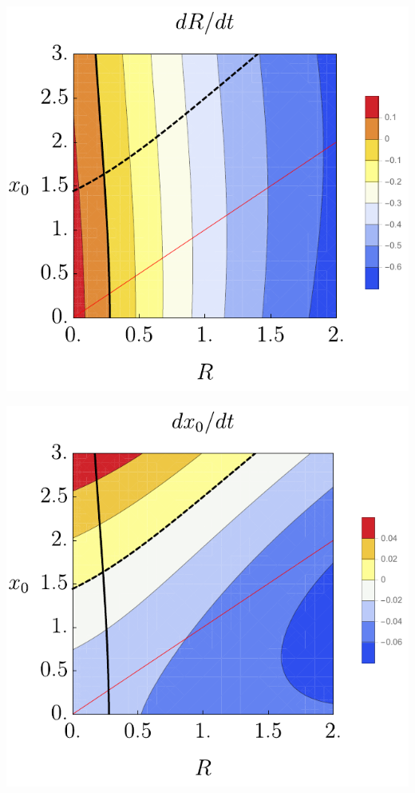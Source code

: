 \documentclass{Dissertate}
\let\origfigure\figure
\let\endorigfigure\endfigure
\renewenvironment{figure}[1][2] {
    \expandafter\origfigure\expandafter[H]
} {
    \endorigfigure
}
\begin{document}
\begin{figure}
\hypertarget{fig:drdtdecay}{%
\centering
\includegraphics{source/figures/pdf/dRdt.pdf}
\caption{\(dR/dt\) as a function of \(x_0\) and \(R\). The solid black
line denotes the \(dR/dt=0\) and the dashed line \(dx_0/dt=0\). The red
line is the line \(x_0=R\).}\label{fig:drdtdecay}
}
\end{figure}

\begin{figure}
\hypertarget{fig:dxdtdecay}{%
\centering
\includegraphics{source/figures/pdf/dXdt.pdf}
\caption{\(dx_0/dt\) as a function of \(x_0\) and \(R\). The solid black
line denotes the \(dR/dt=0\) and the dashed line \(dx_0/dt=0\). The red
line is the line \(x_0=R\).}\label{fig:dxdtdecay}
}
\end{figure}
\end{document}
